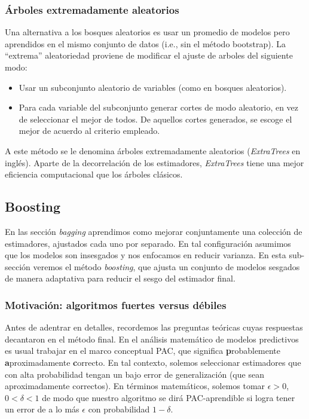 \subsubsection{Árboles extremadamente aleatorios}

Una alternativa a los bosques aleatorios es usar un promedio de modelos pero aprendidos en el mismo conjunto de datos (i.e., sin el método bootstrap). La ``extrema'' aleatoriedad proviene de modificar el ajuste de arboles del siguiente modo:
\begin{itemize}
    \item Usar un subconjunto aleatorio de variables (como en bosques aleatorios).
    \item Para cada variable del subconjunto generar cortes de modo aleatorio, en vez de seleccionar el mejor de todos. De aquellos cortes generados, se escoge el mejor de acuerdo al criterio empleado.
\end{itemize}
A este método se le denomina árboles extremadamente aleatorios (\textit{ExtraTrees} en inglés). Aparte de la decorrelación de los estimadores, \textit{ExtraTrees} tiene una mejor eficiencia computacional que los árboles clásicos.


\subsection{Boosting}
\label{sec:boosting}

En las sección \textit{bagging} aprendimos como mejorar conjuntamente una colección de estimadores, ajustados cada uno por separado. En tal configuración asumimos que los modelos son insesgados y nos enfocamos en reducir varianza. En esta sub-sección veremos el método \textit{boosting}, que ajusta un conjunto de modelos sesgados de manera adaptativa para reducir el sesgo del estimador final.

\subsubsection{Motivación: algoritmos fuertes versus débiles}

Antes de adentrar en detalles, recordemos las preguntas teóricas cuyas respuestas decantaron en el método final. En el análisis matemático de modelos predictivos es usual trabajar en el marco conceptual PAC, que significa \textbf{p}robablemente \textbf{a}proximadamente \textbf{c}orrecto. En tal contexto, solemos seleccionar estimadores que con alta probabilidad tengan un bajo error de generalización (que sean aproximadamente correctos). En términos matemáticos, solemos tomar $\epsilon > 0$, $0 < \delta < 1$ de modo que nuestro algoritmo se dirá PAC-aprendible si logra tener un error de a lo más $\epsilon$ con probabilidad $1-\delta$.

